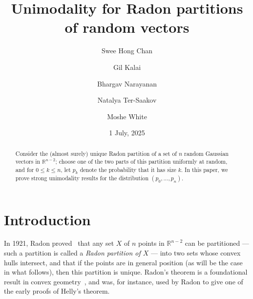 \documentclass[12pt,english,reqno]{amsart}
\theoremstyle{plain}
\theoremstyle{remark}
\numberwithin{figure}{section}
\numberwithin{equation}{section}
\def\rr{\mathbb{R}}
\newcommand{\com}[2]{\textcolor{blue}{\texttt{#1 comment: #2}}}
\newcommand{\darkblue}{\color{darkblue}}
\newcommand{\defnb}[1]{\emph{\darkblue #1}}
\begin{document}
\title{Unimodality for Radon partitions of random vectors}

\author{Swee Hong Chan}
\address{Department of Mathematics, Rutgers University, Piscataway, NJ 08854, USA}

\author{Gil Kalai}
\address{Einstein Institute of Mathematics, Hebrew University, Givat-Ram, Jerusalem 91904, Israel and Efi Arazi School of Computer Science, Reichman University, Herzliya 4610101, Israel}

\author{Bhargav Narayanan}
\address{Department of Mathematics, Rutgers University, Piscataway, NJ 08854, USA}

\author{Natalya Ter-Saakov}
\address{Department of Mathematics, Rutgers University, Piscataway, NJ 08854, USA}

\author{Moshe White}
\address{Einstein Institute of Mathematics, Hebrew University, Givat-Ram, Jerusalem 91904, Israel}

\date{1 July, 2025}

\begin{abstract}
	Consider the (almost surely) unique Radon partition of a set of $n$ random Gaussian vectors in $\mathbb R^{n-2}$; choose one of the two parts of this partition uniformly at random, and for $0 \le k \le n$,  let \( p_k \) denote the probability that it has size \( k \).  In this paper, we prove strong unimodality results for the distribution $(p_0,\dots,p_n)$.
\end{abstract}
\maketitle

\section{Introduction} \label{s:intro}
In 1921, Radon proved~\citep{Rad} that any set $X$ of $n$ points in $\rr^{n-2}$ can be partitioned --- such a partition is called a \defnb{Radon partition of $X$} --- into two sets whose convex hulls intersect, and that if the points are in general position (as will be the case in what follows), then this partition is unique. Radon's theorem is a foundational result in convex geometry~\citep{Bar21,Eck79,Eck93}, and was, for instance, used by Radon to give one of the early proofs of Helly's theorem.
\end{document}
